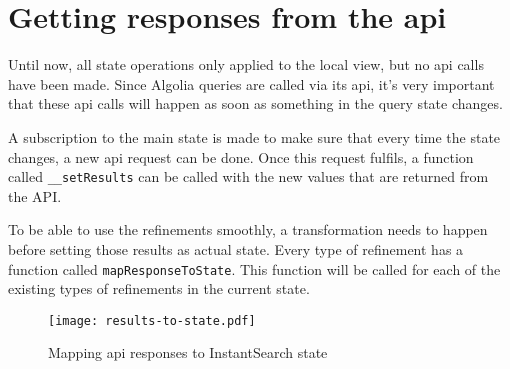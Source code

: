 
\section{Getting responses from the \acrshort{api}} %
\label{sec:getting_responses_from_the_api}

Until now, all state operations only applied to the local view, but no \acrshort{api} calls have been made. Since Algolia queries are called via its \acrshort{api}, it's very important that these \acrshort{api} calls will happen as soon as something in the query state changes. 

A subscription to the main state is made to make sure that every time the state changes, a new \acrshort{api} request can be done. Once this request fulfils, a function called {\tt \_\_setResults} can be called with the new values that are returned from the API.

To be able to use the refinements smoothly, a transformation needs to happen before setting those results as actual state. Every type of refinement has a function called {\tt mapResponseToState}. This function will be called for each of the existing types of refinements in the current state.

\begin{figure}[H]
  \centering
  \texttt{[image: results-to-state.pdf]}
  \caption{Mapping \acrshort{api} responses to InstantSearch state}
  \label{figure:results-to-state}
\end{figure}

